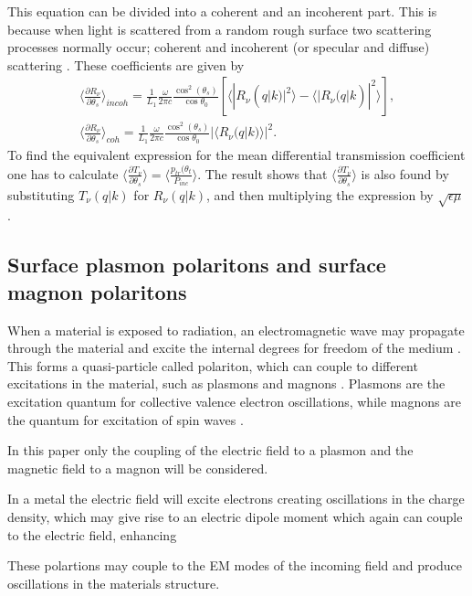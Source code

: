 \documentclass[../main.tex]{subfiles}
\begin{document}
This equation can be divided into a coherent and an incoherent part. This is because when light is scattered from a random rough surface two scattering processes normally occur; coherent and incoherent (or specular and diffuse) scattering \cite{Simonsen2010}. These coefficients are given by
\begin{equation}
\begin{array}{cc}
    \langle \frac{\partial R_\nu}{\partial \theta_s}\rangle_{incoh} =  \frac{1}{L_1}\frac{\omega}{2\pi c}\frac{\cos^2(\theta_s)}{\cos\theta_0} [\langle |R_\nu(q|k)|^2 \rangle - \langle |R_\nu(q|k)|^2\rangle],
    \\
    \langle \frac{\partial R_\nu}{\partial \theta_s}\rangle_{coh} =  \frac{1}{L_1}\frac{\omega}{2\pi c}\frac{\cos^2(\theta_s)}{\cos\theta_0} |\langle R_\nu(q|k)\rangle|^2.
\end{array}
\end{equation}
To find the equivalent expression for the mean differential transmission coefficient one has to calculate $\langle \frac{\partial T_\nu}{\partial \theta_s}\rangle = \langle \frac{p_{tr}(\theta_t}{P_{inc}}\rangle$. The result shows that $\langle \frac{\partial T_\nu}{\partial \theta_s}\rangle$ is also found by substituting $T_\nu(q|k)$ for $R_\nu(q|k)$, and then multiplying the expression by $\sqrt{\epsilon\mu}$. 

\subsection{Surface plasmon polaritons and surface magnon polaritons}
When a material is exposed to radiation, an electromagnetic wave may propagate through the material and excite the internal degrees for freedom of the medium \cite{D.L.Mills_1974}. This forms a quasi-particle called polariton, which can couple to different excitations in the material, such as plasmons and magnons \cite{HOOPER201437}. Plasmons are the excitation quantum for collective valence electron oscillations, while magnons are the quantum for excitation of spin waves \cite{Pines1961}.



In this paper only the coupling of the electric field to a plasmon and the magnetic field to a magnon will be considered. 

In a metal the electric field will excite electrons creating oscillations in the charge density, which may give rise to an electric dipole moment which again can couple to the electric field, enhancing 

These polartions may couple to the EM modes of the incoming field and produce oscillations in the materials structure. 
\end{document}
